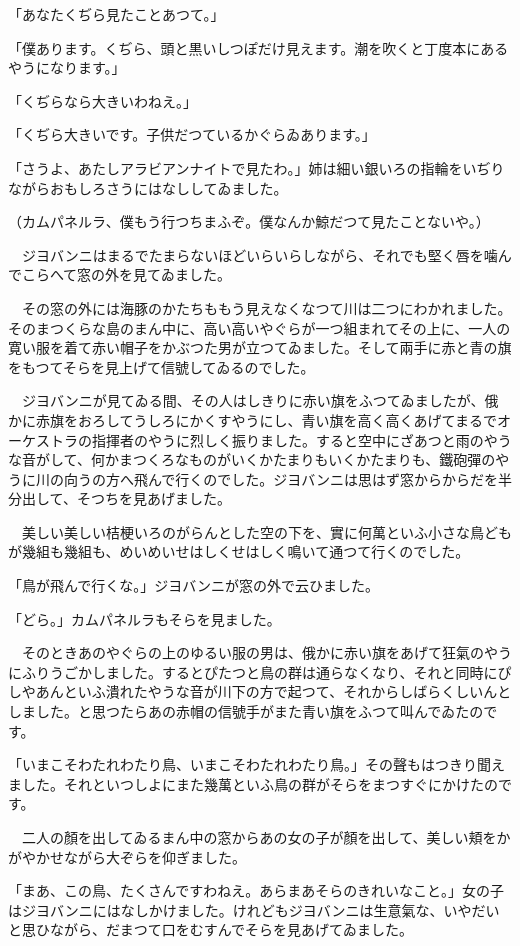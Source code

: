 \documentclass[tate,paper=b6j,jafontsize=9pt]{jlreq}
\begin{document}
「あなたくぢら見たことあつて。」

「僕あります。くぢら、頭と黒いしつぽだけ見えます。潮を吹くと丁度本にあるやうになります。」

「くぢらなら大きいわねえ。」

「くぢら大きいです。子供だつているかぐらゐあります。」

「さうよ、あたしアラビアンナイトで見たわ。」姉は細い銀いろの指輪をいぢりながらおもしろさうにはなししてゐました。

（カムパネルラ、僕もう行つちまふぞ。僕なんか鯨だつて見たことないや。）

　ジヨバンニはまるでたまらないほどいらいらしながら、それでも堅く唇を噛んでこらへて窓の外を見てゐました。

　その窓の外には海豚のかたちももう見えなくなつて川は二つにわかれました。そのまつくらな島のまん中に、高い高いやぐらが一つ組まれてその上に、一人の寛い服を着て赤い帽子をかぶつた男が立つてゐました。そして兩手に赤と青の旗をもつてそらを見上げて信號してゐるのでした。

　ジヨバンニが見てゐる間、その人はしきりに赤い旗をふつてゐましたが、俄かに赤旗をおろしてうしろにかくすやうにし、青い旗を高く高くあげてまるでオーケストラの指揮者のやうに烈しく振りました。すると空中にざあつと雨のやうな音がして、何かまつくろなものがいくかたまりもいくかたまりも、鐵砲彈のやうに川の向うの方へ飛んで行くのでした。ジヨバンニは思はず窓からからだを半分出して、そつちを見あげました。

　美しい美しい桔梗いろのがらんとした空の下を、實に何萬といふ小さな鳥どもが幾組も幾組も、めいめいせはしくせはしく鳴いて通つて行くのでした。

「鳥が飛んで行くな。」ジヨバンニが窓の外で云ひました。

「どら。」カムパネルラもそらを見ました。

　そのときあのやぐらの上のゆるい服の男は、俄かに赤い旗をあげて狂氣のやうにふりうごかしました。するとぴたつと鳥の群は通らなくなり、それと同時にぴしやあんといふ潰れたやうな音が川下の方で起つて、それからしばらくしいんとしました。と思つたらあの赤帽の信號手がまた青い旗をふつて叫んでゐたのです。

「いまこそわたれわたり鳥、いまこそわたれわたり鳥。」その聲もはつきり聞えました。それといつしよにまた幾萬といふ鳥の群がそらをまつすぐにかけたのです。

　二人の顏を出してゐるまん中の窓からあの女の子が顏を出して、美しい頬をかがやかせながら大ぞらを仰ぎました。

「まあ、この鳥、たくさんですわねえ。あらまあそらのきれいなこと。」女の子はジヨバンニにはなしかけました。けれどもジヨバンニは生意氣な、いやだいと思ひながら、だまつて口をむすんでそらを見あげてゐました。
\end{document}

